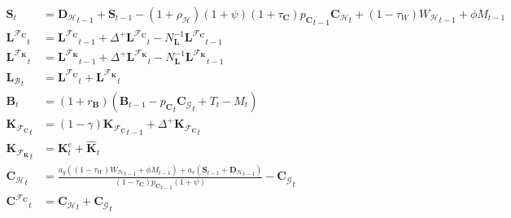 \documentclass[a4paper, headings=standardclasses]{scrartcl}
\numberwithin{equation}{subsection}
\begin{document}
{\begin{align}
		\mathbf{S}_t                        & = {\mathbf{D}_\mathcal{H}}_{t-1} + \mathbf{S}_{t-1} - (1 + \rho_\mathcal{H}) (1 + \psi) (1 + \tau_\mathbf{C}) {p_\mathbf{C}}_{t-1} {\mathbf{C}_\mathcal{H}}_t + (1-\tau_W) {W_\mathcal{H}}_{t-1} + \phi M_{t-1} \\
		{\mathbf{L}^{\mathcal{F}_\mathbf{C}}}_t           & = {\mathbf{L}^{\mathcal{F}_\mathbf{C}}}_{t-1} + \Delta^+{\mathbf{L}^{\mathcal{F}_\mathbf{C}}}_t - N_\mathbf{L}^{-1} {\mathbf{L}^{\mathcal{F}_\mathbf{C}}}_{t-1}\\
		{\mathbf{L}^{\mathcal{F}_\mathbf{K}}}_t           & =  {\mathbf{L}^{\mathcal{F}_\mathbf{K}}}_{t-1} + \Delta^+{\mathbf{L}^{\mathcal{F}_\mathbf{K}}}_t - N_\mathbf{L}^{-1} {\mathbf{L}^{\mathcal{F}_\mathbf{K}}}_{t-1} \\
		{\mathbf{L}_\mathcal{B}}_t                        & = {\mathbf{L}^{\mathcal{F}_\mathbf{C}}}_t + {\mathbf{L}^{\mathcal{F}_\mathbf{K}}}_t                                                                                                                                                                                           \\
		\mathbf{B}_t                        & = (1 + r_\mathbf{B}) (\mathbf{B}_{t-1} - {p_\mathbf{C}}_t {\mathbf{C}_\mathcal{G}}_t + T_t - M_t)                                                                                                                                                                                                                                                                            \\
		{\mathbf{K}_{\mathcal{F}_\mathbf{C}}}_t           & = (1 - \gamma) {\mathbf{K}_{\mathcal{F}_\mathbf{C}}}_{t-1} + \Delta^+ {\mathbf{K}_{\mathcal{F}_\mathbf{C}}}_t \\
		{\mathbf{K}_{\mathcal{F}_\mathbf{K}}}_t           & = \mathbf{K}^e_t + \hat{\mathbf{K}}_t \\
		{\mathbf{C}_\mathcal{H}}_t                        & =  \frac{a_y ((1-\tau_W) {W_\mathcal{H}}_{t-1} + \phi M_{t-1}) + a_v (\mathbf{S}_{t-1} + {\mathbf{D}_\mathcal{H}}_{t-1})}{{(1-\tau_\mathbf{C}) p_\mathbf{C}}_{t-1} (1+\psi)} - {\mathbf{C}_\mathcal{G}}_t \\
		{\mathbf{C}^{\mathcal{F}_\mathbf{C}}}_t           & = {\mathbf{C}_\mathcal{H}}_t + {\mathbf{C}_\mathcal{G}}_t                                                                                                                                                                                                                     \\

\end{align}}
\end{document}
